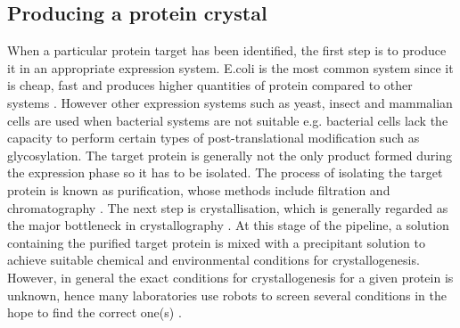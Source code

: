     \subsection{Producing a protein crystal}
    \label{sub:Producing a protein crystal}
        When a particular protein target has been identified, the first step is to produce it in an appropriate expression system. E.coli is the most common system since it is cheap, fast and produces higher quantities of protein compared to other systems \cite{rai2001expression}. However other expression systems such as yeast, insect and mammalian cells are used when bacterial systems are not suitable e.g. bacterial cells lack the capacity to perform certain types of post-translational modification such as glycosylation.
        The target protein is generally not the only product formed during the expression phase so it has to be isolated. The process of isolating the target protein is known as purification, whose methods include filtration and chromatography \cite{graslund2008protein}.
        The next step is crystallisation, which is generally regarded as the major bottleneck in crystallography \cite{garman2014}. At this stage of the pipeline, a solution containing the purified target protein is mixed with a precipitant solution to achieve suitable chemical and environmental conditions for crystallogenesis. However, in general the exact conditions for crystallogenesis for a given protein is unknown, hence many laboratories use robots to screen several conditions in the hope to find the correct one(s) \cite{luft2007efficient}.

